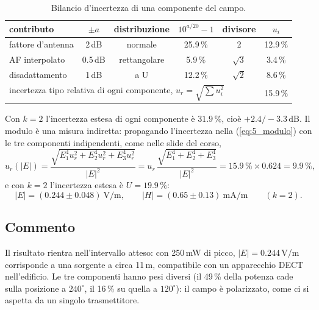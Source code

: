 \documentclass[11pt,a4paper,oneside]{book}
\begin{document}
\begin{table}[H]
\centering
\renewcommand{\arraystretch}{1.2}
\begin{tabular}{l c c c c c}
\hline
contributo & $\pm a$ & distribuzione & $10^{a/20}-1$ & divisore & $u_i$ \\ \hline
fattore d'antenna & 2\,dB & normale & 25.9\,\% & 2 & 12.9\,\% \\
AF interpolato & 0.5\,dB & rettangolare & 5.9\,\% & $\sqrt3$ & 3.4\,\% \\
disadattamento & 1\,dB & a U & 12.2\,\% & $\sqrt2$ & 8.6\,\% \\ \hline
\multicolumn{5}{l}{incertezza tipo relativa di ogni componente, $u_r = \sqrt{\textstyle\sum u_i^2}$} & 15.9\,\% \\ \hline
\end{tabular}
\caption{Bilancio d'incertezza di una componente del campo.}
\label{tab:5_4_budget}
\end{table}

Con $k = 2$ l'incertezza estesa di ogni componente è $31.9\,\%$, cioè $+2.4/-3.3$\,dB. Il modulo è una misura indiretta: propagando l'incertezza nella (\ref{eq:5_modulo}) con le tre componenti indipendenti, come nelle slide del corso,
\begin{equation}
u_r(|E|) = \frac{\sqrt{E_1^4 u_{r}^2 + E_2^4 u_{r}^2 + E_3^4 u_{r}^2}}{|E|^2}
         = u_r\,\frac{\sqrt{E_1^4 + E_2^4 + E_3^4}}{|E|^2} = 15.9\,\% \times 0.624 = 9.9\,\%,
\end{equation}
e con $k = 2$ l'incertezza estesa è $U = 19.9\,\%$:
\begin{equation}
|E| = (0.244 \pm 0.048)\ \mathrm{V/m}, \qquad |H| = (0.65 \pm 0.13)\ \mathrm{mA/m} \qquad (k = 2).
\end{equation}

\subsection{Commento}
Il risultato rientra nell'intervallo atteso: con 250\,mW di picco, $|E| = 0.244$\,V/m corrisponde a una sorgente a circa 11\,m, compatibile con un apparecchio DECT nell'edificio. Le tre componenti hanno pesi diversi (il 49\,\% della potenza cade sulla posizione a $240^\circ$, il 16\,\% su quella a $120^\circ$): il campo è polarizzato, come ci si aspetta da un singolo trasmettitore.

\end{document}
